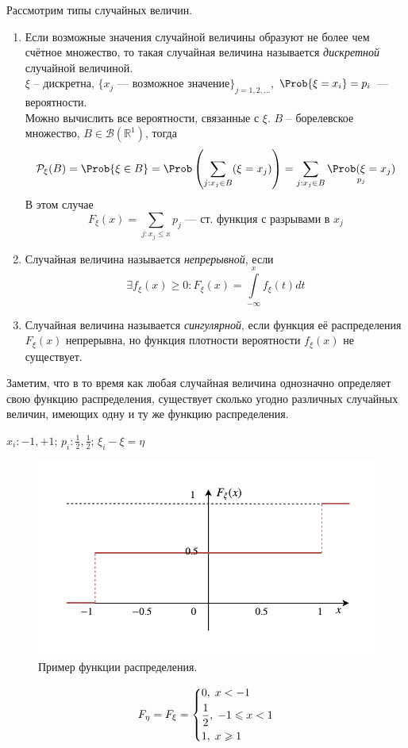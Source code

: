 Рассмотрим типы случайных величин.
\begin{enumerate}
	\item Если возможные значения случайной величины образуют не более чем счётное множество, то такая случайная величина называется \textit{дискретной} случайной величиной. \\
	$\xi$ -- дискретна, $\{x_j \text{ --- возможное значение} \}_{j = 1, 2, \ldots}$, $\Prob \{ \xi = x_i \} = p_i$ --- вероятности. \\
	Можно вычислить все вероятности, связанные с $\xi$. $B$ -- борелевское множество, $B \in \mathcal{B} (\mathbb{R}^1)$, тогда
	\[
		\mathcal{P}_\xi (B) = \Prob \{ \xi \in B\} = \Prob \left(\sum\limits_{j : x_j \in B} (\xi = x_j)\right) = \sum\limits_{j : x_j \in B} \underset{p_j}{\Prob (\xi = x_j)}
	\]
	В этом случае
	\[
		F_\xi (x) = \sum\limits_{j : x_j \leqslant x} p_j \text{ --- ст. функция с разрывами в $x_j$}
	\]
	\item Случайная величина называется \textit{непрерывной}, если
	\[
		\exists f_\xi (x) \geqslant 0 : F_\xi (x) = \int\limits_{-\infty}^x f_\xi (t) dt
	\]
	\item Случайная величина называется \textit{сингулярной}, если функция её распределения $F_\xi (x)$ непрерывна, но функция плотности вероятности $f_\xi (x)$ не существует.
\end{enumerate}
Заметим, что в то время как любая случайная величина однозначно определяет свою функцию распределения, существует сколько угодно различных случайных величин, имеющих одну и ту же функцию распределения.
\begin{example} $x_i: -1, +1$; $p_i: \frac{1}{2}, \frac{1}{2}$; $\xi_i - \xi = \eta$

\begin{figure}[H]
	\begin{center}
	\includegraphics[width=\textwidth,height=\textheight,keepaspectratio]{Images/plot2-4.pdf}
	\end{center}
	\caption{Пример функции распределения.}
\end{figure}

	\[
		F_\eta = F_\xi =
		\begin{dcases*}
			0, \; x < -1 \\
			\frac{1}{2}, \; -1 \leqslant x < 1 \\
			1, \; x \geqslant 1
		\end{dcases*}
	\]
\end{example}
